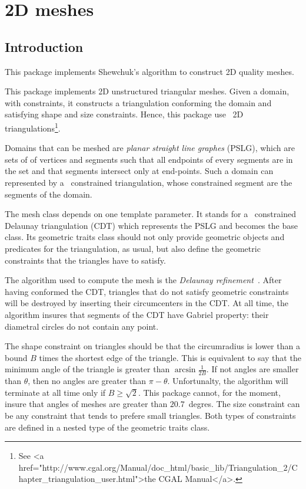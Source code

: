 \chapter{2D meshes}

\minitoc

\section{Introduction}

This package implements Shewchuk's algorithm to construct 2D quality
meshes.


This package implements 2D unstructured triangular meshes. Given a
domain, with constraints, it constructs a triangulation conforming the
domain and satisfying shape and size constraints. Hence, this package 
use \cgal\ 2D triangulations\footnote{See 
{<a href="http://www.cgal.org/Manual/doc_html/basic_lib/Triangulation_2/Chapter_triangulation_user.html">the CGAL Manual</a>.}}.

Domains that can be meshed are \emph{planar straight line graphes}
(PSLG), which are sets of of vertices and segments such that all
endpoints of every segments are in the set and that segments intersect
only at end-points. Such a domain can represented by a \cgal\ 
constrained triangulation, whose constrained segment are the segments
of the domain.

The mesh class depends on one template parameter. It stands for a
\cgal\ constrained Delaunay triangulation (CDT) which represents the
PSLG and becomes the base class. Its geometric traits class should not
only provide geometric objects and predicates for the triangulation,
as usual, but also define the geometric constraints that the triangles
have to satisfy.

The algorithm used to compute the mesh is the \emph{Delaunay
  refinement}~\cite{s-mgdsa-00}. After having conformed the CDT,
triangles that do not satisfy geometric constraints will be destroyed
by inserting their circumcenters in the CDT. At all time, the algorithm
insures that segments of the CDT have Gabriel property: their diametral
circles do not contain any point.

The shape constraint on triangles should be that the circumradius is
lower than a bound $B$ times the shortest edge of the triangle. This is
equivalent to say that the minimum angle of the triangle is greater
than $\arcsin{\frac{1}{2B}}$. If not angles are smaller than $\theta$,
then no angles are greater than $\pi - \theta$. Unfortunalty, the
algorithm will terminate at all time only if $B \ge \sqrt{2}$. This
package cannot, for the moment, insure that angles of meshes are
greater than $20.7$~degres. The size constraint can be any constraint
that tends to prefere small triangles. Both types of constraints are
defined in a nested type \ccc{Is_bad} of the geometric traits class.


